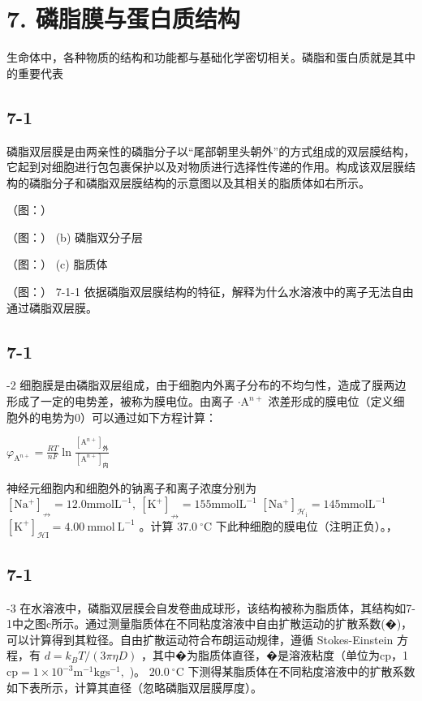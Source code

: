 \section*{7. 磷脂膜与蛋白质结构}
⽣命体中，各种物质的结构和功能都与基础化学密切相关。磷脂和蛋⽩质就是其中的重要代表

\subsection*{7-1}
磷脂双层膜是由两亲性的磷脂分⼦以“尾部朝⾥头朝外”的⽅式组成的双层膜结构，它起到对细胞进⾏包包裹保护以及对物质进⾏选择性传递的作⽤。构成该双层膜结构的磷脂分⼦和磷脂双层膜结构的⽰意图以及其相关的脂质体如右所⽰。

（图：）

（图：）
(b) 磷脂双分⼦层

（图：）
(c) 脂质体

（图：）
7-1-1 依据磷脂双层膜结构的特征，解释为什么⽔溶液中的离⼦⽆法⾃由通过磷脂双层膜。

\subsection*{7-1}
-2 细胞膜是由磷脂双层组成，由于细胞内外离⼦分布的不均匀性，造成了膜两边形成了⼀定的电势差，被称为膜电位。由离⼦ $\mathrm { \cdot } \mathrm { A } ^ { n + }$ 浓差形成的膜电位（定义细胞外的电势为0）可以通过如下⽅程计算：

$
\varphi_ {\mathrm{A} ^ {n +}} = \frac {R T}{n F} \ln \frac {[ \mathrm{A} ^ {n +} ] _ {\mathrm{外}}}{[ \mathrm{A} ^ {n +} ] _ {\mathrm{内}}}
$

神经元细胞内和细胞外的钠离⼦和离⼦浓度分别为 $[ \mathrm { N a ^ { + } } ] _ { \nrightarrow } = 1 2 . 0 \mathrm { m m o l } \mathrm { L ^ { - 1 } , ~ [ \mathrm { K ^ { + } } ] _ { \nrightarrow } = 1 5 5 \mathrm { m m o l } \mathrm { L ^ { - 1 } } }$ $[ \mathrm { N a ^ { + } } ] _ { \scriptscriptstyle \mathcal { H } _ { \mathrm { i } } } = 1 4 5 \mathrm { m m o l } \mathrm { L } ^ { \scriptscriptstyle - 1 }$ $[ \mathrm { K } ^ { + } ] _ { \mathcal { H } \mathrm { I } } = 4 . 0 0 \ \mathrm { m m o l } \ \mathrm { L } ^ { - 1 }$ 。计算 $3 7 . 0 ~ ^ { \circ } \mathrm { C }$ 下此种细胞的膜电位（注明正负）。，

\subsection*{7-1}
-3 在⽔溶液中，磷脂双层膜会⾃发卷曲成球形，该结构被称为脂质体，其结构如7-1中之图c所⽰。通过测量脂质体在不同粘度溶液中⾃由扩散运动的扩散系数(�)，可以计算得到其粒径。⾃由扩散运动符合布朗运动规律，遵循 Stokes-Einstein ⽅程，有 $d = k _ { B } T / ( 3 \pi \eta D )$ ，其中�为脂质体直径，�是溶液粘度（单位为cp，1$\mathrm { c p } = 1 { \times } 1 0 ^ { - 3 } \mathrm { m } ^ { - 1 } \mathrm { k g } \mathrm { s } ^ { - 1 } ,$ )。 $2 0 . 0 \ ^ { \circ } \mathrm { C }$ 下测得某脂质体在不同粘度溶液中的扩散系数如下表所⽰，计算其直径（忽略磷脂双层膜厚度）。

